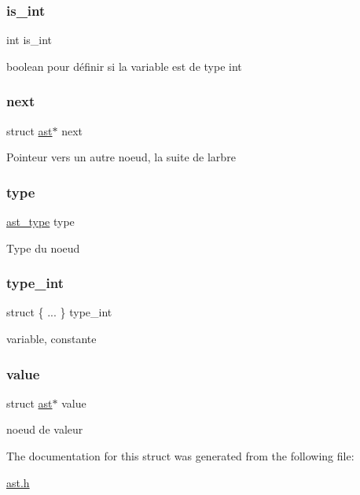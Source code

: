\subsubsection{\texorpdfstring{is\+\_\+int}{is\_int}}
{\footnotesize\ttfamily int is\+\_\+int}

boolean pour définir si la variable est de type int \mbox{\label{structast_ae48f04f7acec87ecf7f0bc953cb56bf4}} 
\subsubsection{\texorpdfstring{next}{next}}
{\footnotesize\ttfamily struct \hyperlink{structast}{ast}$\ast$ next}

Pointeur vers un autre noeud, la suite de l\textquotesingle{}arbre \mbox{\label{structast_a8321fc8e556a418583dd74ee9fcc2bf7}} 
\subsubsection{\texorpdfstring{type}{type}}
{\footnotesize\ttfamily \hyperlink{ast_8h_a77091c187ac9a89404fac2e8226daef3}{ast\+\_\+type} type}

Type du noeud \mbox{\label{structast_a48c1fea64ccd73c68d3901c23d65f9f5}} 
\subsubsection{\texorpdfstring{type\+\_\+int}{type\_int}}
{\footnotesize\ttfamily struct \{ ... \}   type\+\_\+int}

variable, constante \mbox{\label{structast_a0547e48c9f9ecb35c94f988890f217b7}} 
\subsubsection{\texorpdfstring{value}{value}}
{\footnotesize\ttfamily struct \hyperlink{structast}{ast}$\ast$ value}

noeud de valeur 

The documentation for this struct was generated from the following file\+:\begin{DoxyCompactItemize}
\item 
\hyperlink{ast_8h}{ast.\+h}\end{DoxyCompactItemize}
